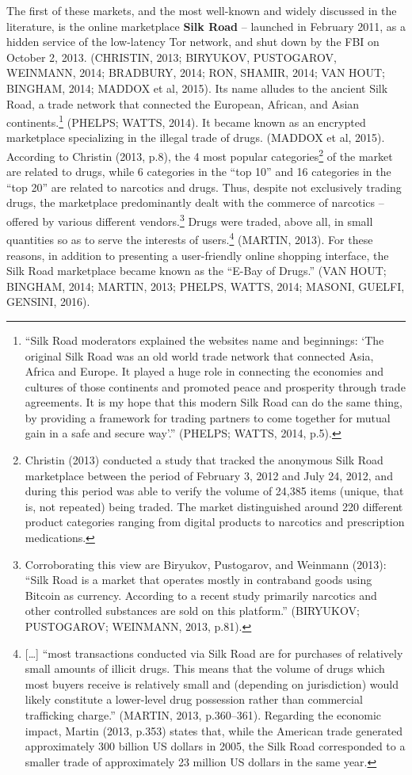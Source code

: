 The first of these markets, and the most well-known and widely discussed in the literature, is the online marketplace \textbf{Silk Road} -- launched in February 2011, as a hidden service of the low-latency Tor network, and shut down by the FBI on October 2, 2013. (CHRISTIN, 2013; BIRYUKOV, PUSTOGAROV, WEINMANN, 2014; BRADBURY, 2014; RON, SHAMIR, 2014; VAN HOUT; BINGHAM, 2014; MADDOX et al, 2015). Its name alludes to the ancient Silk Road, a trade network that connected the European, African, and Asian continents.\footnote{``Silk Road moderators explained the websites name and beginnings: `The original Silk Road was an old world trade network that connected Asia, Africa and Europe. It played a huge role in connecting the economies and cultures of those continents and promoted peace and prosperity through trade agreements. It is my hope that this modern Silk Road can do the same thing, by providing a framework for trading partners to come together for mutual gain in a safe and secure way'.'' (PHELPS; WATTS, 2014, p.5).} (PHELPS; WATTS, 2014). It became known as an encrypted marketplace specializing in the illegal trade of drugs. (MADDOX et al, 2015). According to Christin (2013, p.8), the 4 most popular categories\footnote{Christin (2013) conducted a study that tracked the anonymous Silk Road marketplace between the period of February 3, 2012 and July 24, 2012, and during this period was able to verify the volume of 24,385 items (unique, that is, not repeated) being traded. The market distinguished around 220 different product categories ranging from digital products to narcotics and prescription medications.} of the market are related to drugs, while 6 categories in the ``top 10'' and 16 categories in the ``top 20'' are related to narcotics and drugs. Thus, despite not exclusively trading drugs, the marketplace predominantly dealt with the commerce of narcotics -- offered by various different vendors.\footnote{Corroborating this view are Biryukov, Pustogarov, and Weinmann (2013): ``Silk Road is a market that operates mostly in contraband goods using Bitcoin as currency. According to a recent study primarily narcotics and other controlled substances are sold on this platform.'' (BIRYUKOV; PUSTOGAROV; WEINMANN, 2013, p.81).} Drugs were traded, above all, in small quantities so as to serve the interests of users.\footnote{{[}\ldots{]} ``most transactions conducted via Silk Road are for purchases of relatively small amounts of illicit drugs. This means that the volume of drugs which most buyers receive is relatively small and (depending on jurisdiction) would likely constitute a lower-level drug possession rather than commercial trafficking charge.'' (MARTIN, 2013, p.360--361). Regarding the economic impact, Martin (2013, p.353) states that, while the American trade generated approximately 300 billion US dollars in 2005, the Silk Road corresponded to a smaller trade of approximately 23 million US dollars in the same year.} (MARTIN, 2013). For these reasons, in addition to presenting a user-friendly online shopping interface, the Silk Road marketplace became known as the ``E-Bay of Drugs.'' (VAN HOUT; BINGHAM, 2014; MARTIN, 2013; PHELPS, WATTS, 2014; MASONI, GUELFI, GENSINI, 2016).

